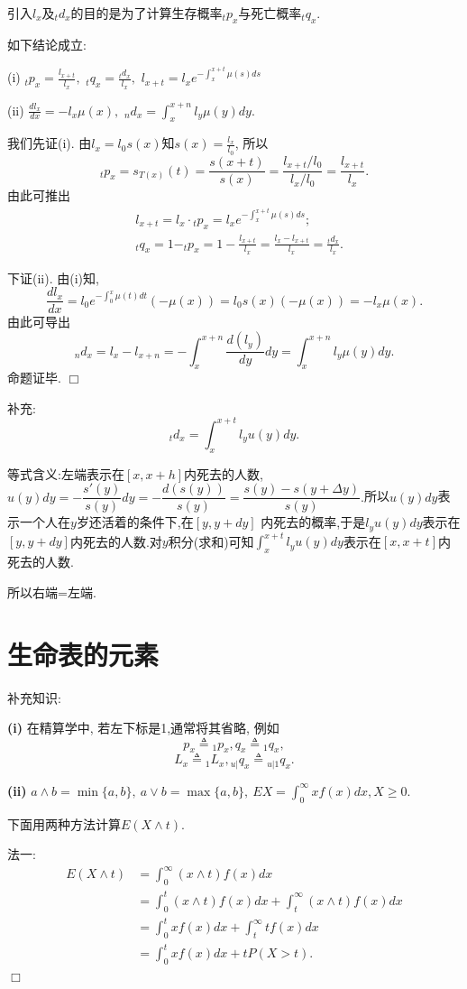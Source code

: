 \documentclass[a4paper,10pt]{ctexbook}
\def\qed{\hfill$\Box$\medskip}
\begin{document}
引入$l_x$及${}_td_x$的目的是为了计算生存概率${}_tp_x$与死亡概率${}_tq_x.$
\begin{proposition}如下结论成立:

    (i) ${}_tp_x=\frac{l_{x+t}}{l_x},$  ${}_tq_x=\frac{{}_td_x}{l_x},$  $l_{x+t}=l_xe^{-\int_{x}^{x+t}\mu(s)ds}$

    (ii) $\frac{dl_x}{dx}=-l_x\mu(x),$ $_nd_x=\int_{x}^{x+n}l_y\mu(y)dy.$
\end{proposition}

\proof 我们先证(i). 由$l_x=l_0s(x)$知$s(x)=\frac{l_x}{l_0}$, 所以
$$_tp_x=s_{T(x)}(t)=\frac{s(x+t)}{s(x)}=\frac{l_{x+t}/l_0}{l_x/l_0}=\frac{l_{x+t}}{l_x}.$$
由此可推出\begin{align*}
     & l_{x+t}=l_x\cdot{}_tp_x=l_xe^{-\int_{x}^{x+t}\mu(s)ds};                          \\
     & {}_tq_x=1-_tp_x=1-\frac{l_{x+t}}{l_x}=\frac{l_x-l_{x+t}}{l_x}=\frac{_td_x}{l_x}.
\end{align*}

下证(ii). 由(i)知,
$$\frac{dl_x}{dx}=l_0e^{-\int_{0}^{x}\mu(t)dt}(-\mu(x))=l_0s(x)(-\mu(x))=-l_x\mu(x).$$
由此可导出
$${}_nd_x=l_x-l_{x+n}=-\int_{x}^{x+n}\frac{d(l_y)}{dy}dy=\int_{x}^{x+n}l_y\mu(y)dy.$$
命题证毕.
\qed

补充:
$${}_td_x=\int_x^{x+t} l_yu(y)dy.$$

等式含义:左端表示在$[x,x+h]$内死去的人数, $u(y)dy=-\dfrac{s'(y)}{s(y)}dy=-\dfrac{d(s(y))}{s(y)}=\dfrac{s(y)-s(y+\Delta y)}{s(y)}.$所以$u(y)dy$表示一个人在$y$岁还活着的条件下,在$[y,y+dy]$ 内死去的概率,于是$l_yu(y)dy$表示在$[y,y+dy]$内死去的人数.对$y$积分(求和)可知$\int_x^{x+t}l_yu(y)dy$表示在$[x,x+t]$内死去的人数.

所以右端=左端.
\section{生命表的元素}
补充知识:

{\rm\bf(i)} 在精算学中, 若左下标是1,通常将其省略, 例如
$${p_x}\triangleq{}_1p_x,{q_x}\triangleq{}_1q_x,$$
$$L_x\triangleq{}_1L_x,{}_{u|}q_x\triangleq{}_{u|1}q_x.$$

{\rm\bf(ii)} $a\wedge b=\min\{a,b\},\ a\vee b=\max\{a,b\},\ EX=\int_0^{\infty}xf(x)dx,X\ge0.$

下面用两种方法计算$E(X\wedge t).$


法一:
\begin{align*}
    E(X\wedge t) & =\int_0^{\infty}(x\wedge t)f(x)dx                           \\
                 & =\int_0^t(x\wedge t)f(x)dx+\int_t^{\infty}(x\wedge t)f(x)dx \\
                 & =\int_0^txf(x)dx+\int_t^{\infty}tf(x)dx                     \\
                 & =\int_0^txf(x)dx+tP(X>t).
\end{align*}
\qed
\end{document}
